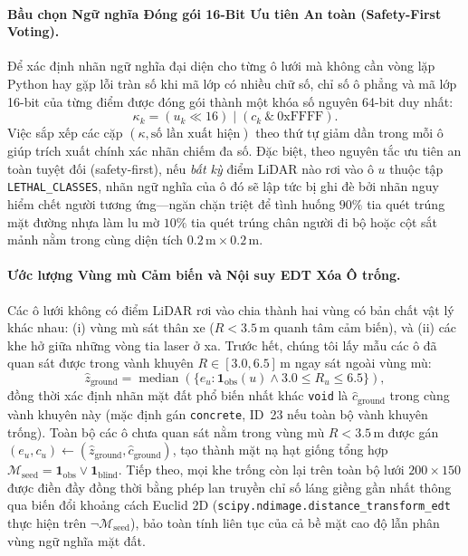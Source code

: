 \documentclass[a4paper,fleqn]{cas-sc}
\begin{document}
\paragraph{Bầu chọn Ngữ nghĩa Đóng gói 16-Bit Ưu tiên An toàn (Safety-First Voting).}
Để xác định nhãn ngữ nghĩa đại diện cho từng ô lưới mà không cần vòng lặp Python hay gặp lỗi tràn số khi mã lớp có nhiều chữ số, chỉ số ô phẳng và mã lớp 16-bit của từng điểm được đóng gói thành một khóa số nguyên 64-bit duy nhất:
\begin{equation}
    \kappa_k = (u_k \ll 16) \mid (c_k \ \& \ \text{0xFFFF}).
\end{equation}
Việc sắp xếp các cặp $(\kappa, \text{số lần xuất hiện})$ theo thứ tự giảm dần trong mỗi ô giúp trích xuất chính xác nhãn chiếm đa số. Đặc biệt, theo nguyên tắc ưu tiên an toàn tuyệt đối (safety-first), nếu \emph{bất kỳ} điểm LiDAR nào rơi vào ô $u$ thuộc tập \texttt{LETHAL\_CLASSES}, nhãn ngữ nghĩa của ô đó sẽ lập tức bị ghi đè bởi nhãn nguy hiểm chết người tương ứng—ngăn chặn triệt để tình huống $90\%$ tia quét trúng mặt đường nhựa làm lu mờ $10\%$ tia quét trúng chân người đi bộ hoặc cột sắt mảnh nằm trong cùng diện tích $0.2\,\text{m} \times 0.2\,\text{m}$.

\paragraph{Ước lượng Vùng mù Cảm biến và Nội suy EDT Xóa Ô trống.}
Các ô lưới không có điểm LiDAR rơi vào chia thành hai vùng có bản chất vật lý khác nhau: (i) vùng mù sát thân xe ($R < 3.5\,\text{m}$ quanh tâm cảm biến), và (ii) các khe hở giữa những vòng tia laser ở xa. Trước hết, chúng tôi lấy mẫu các ô đã quan sát được trong vành khuyên $R \in [3.0, 6.5]\,\text{m}$ ngay sát ngoài vùng mù:
\begin{equation}
    \hat{z}_{\text{ground}} = \operatorname{median}\left(\{e_u : \mathbf{1}_{\text{obs}}(u) \land 3.0 \le R_u \le 6.5\}\right),
\end{equation}
đồng thời xác định nhãn mặt đất phổ biến nhất khác \texttt{void} là $\hat{c}_{\text{ground}}$ trong cùng vành khuyên này (mặc định gán \texttt{concrete}, ID~23 nếu toàn bộ vành khuyên trống). Toàn bộ các ô chưa quan sát nằm trong vùng mù $R < 3.5\,\text{m}$ được gán $(e_u, c_u) \leftarrow (\hat{z}_{\text{ground}}, \hat{c}_{\text{ground}})$, tạo thành mặt nạ hạt giống tổng hợp $\mathcal{M}_{\text{seed}} = \mathbf{1}_{\text{obs}} \lor \mathbf{1}_{\text{blind}}$. Tiếp theo, mọi khe trống còn lại trên toàn bộ lưới $200 \times 150$ được điền đầy đồng thời bằng phép lan truyền chỉ số láng giềng gần nhất thông qua biến đổi khoảng cách Euclid 2D (\texttt{scipy.ndimage.distance\_transform\_edt} thực hiện trên $\neg\mathcal{M}_{\text{seed}}$), bảo toàn tính liên tục của cả bề mặt cao độ lẫn phân vùng ngữ nghĩa mặt đất.
\end{document}
